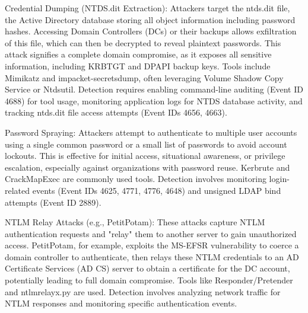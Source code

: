 Credential Dumping (NTDS.dit Extraction): Attackers target the ntds.dit file, the Active Directory database storing all object information including password hashes. Accessing Domain Controllers (DCs) or their backups allows exfiltration of this file, which can then be decrypted to reveal plaintext passwords. This attack signifies a complete domain compromise, as it exposes all sensitive information, including KRBTGT and DPAPI backup keys. Tools include Mimikatz and impacket-secretsdump, often leveraging Volume Shadow Copy Service or Ntdsutil. Detection requires enabling command-line auditing (Event ID 4688) for tool usage, monitoring application logs for NTDS database activity, and tracking ntds.dit file access attempts (Event IDs 4656, 4663).

Password Spraying: Attackers attempt to authenticate to multiple user accounts using a single common password or a small list of passwords to avoid account lockouts. This is effective for initial access, situational awareness, or privilege escalation, especially against organizations with password reuse. Kerbrute and CrackMapExec are commonly used tools. Detection involves monitoring login-related events (Event IDs 4625, 4771, 4776, 4648) and unsigned LDAP bind attempts (Event ID 2889).

NTLM Relay Attacks (e.g., PetitPotam): These attacks capture NTLM authentication requests and "relay" them to another server to gain unauthorized access. PetitPotam, for example, exploits the MS-EFSR vulnerability to coerce a domain controller to authenticate, then relays these NTLM credentials to an AD Certificate Services (AD CS) server to obtain a certificate for the DC account, potentially leading to full domain compromise. Tools like Responder/Pretender and ntlmrelayx.py are used. Detection involves analyzing network traffic for NTLM responses and monitoring specific authentication events.

